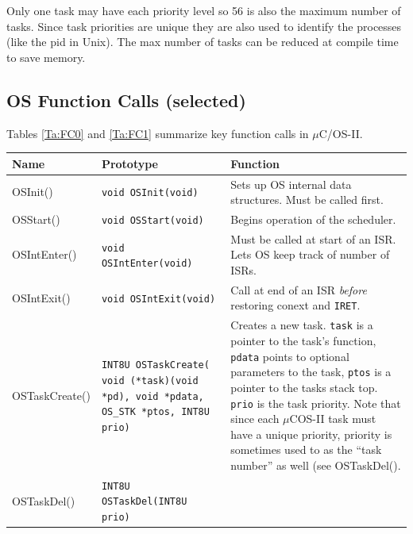 \documentclass{article}	%
\begin{document}
Only one task may have each priority level so 56 is also the maximum
number of tasks.  Since task priorities are unique they are also
used to identify the processes (like the pid in Unix).
The max number of tasks can be reduced at compile time
to save memory.

\subsection{OS Function Calls (selected)}

 Tables \ref{Ta:FC0} and \ref{Ta:FC1}	%
 summarize key function calls in $\mu$C/OS-II.	%


\begin{table}
\begin{center}
  \begin{tabular}{|l|p{1.6in}|p{2.75in} |}
  \hline
Name   &  Prototype  &  Function \\ \hline
 OSInit()       & {\tt void OSInit(void) }      & Sets up OS internal data
                                                  structures. Must be called first. \\ \hline
 OSStart()      & {\tt void OSStart(void) }     & Begins operation of the scheduler.\\ \hline
 OSIntEnter()   & {\tt void OSIntEnter(void)}   & Must be called at start of an ISR.
                                                  Lets OS keep track of number of ISRs. \\ \hline
 OSIntExit()    & {\tt void OSIntExit(void)}    & Call at end of an ISR
                                              {\it before} restoring conext and {\tt IRET}.	%
                                                  \\ \hline
 OSTaskCreate() & {\tt INT8U OSTaskCreate( void (*task)(void *pd), void *pdata, OS\_STK *ptos, INT8U prio) }
                & Creates a new task.
                 {\tt task} is a pointer to the task's function,
                 {\tt pdata} points to optional parameters to the task,
                 {\tt ptos} is a pointer to the tasks stack top.
                 {\tt prio} is the task priority.  Note that since each
                 $\mu$COS-II task must have a unique priority, priority is
                 sometimes used to as the ``task number'' as well (see
                 OSTaskDel().
                   \\ \hline
OSTaskDel()     & {\tt INT8U OSTaskDel(INT8U prio) }    &

\end{tabular}
\end{center}
\end{table}
\end{document}
